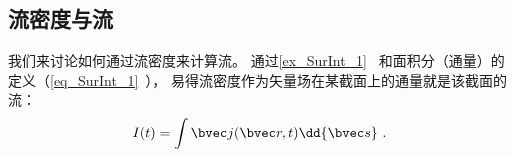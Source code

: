 \subsection{流密度与流}
我们来讨论如何通过流密度来计算流。 通过\autoref{ex_SurInt_1}~ 和面积分（通量）的定义（\autoref{eq_SurInt_1}~）， 易得流密度作为矢量场在某截面上的通量就是该截面的流：
\begin{equation}
I(t) = \int \bvec j(\bvec r, t) \dd{\bvec s}~.
\end{equation}
